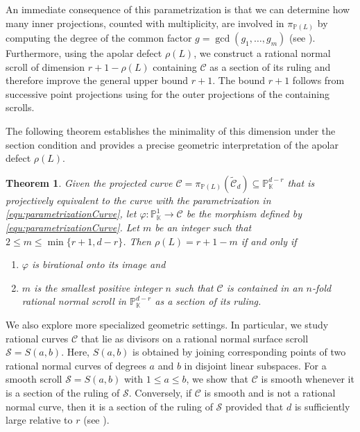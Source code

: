 \documentclass[a4paper, 11pt]{amsart}
\newtheorem{theorem}{Theorem}
\numberwithin{theorem}{section}
\theoremstyle{definition}
\numberwithin{equation}{section}
\begin{document}
An immediate consequence of this parametrization is that we can determine how many inner projections, counted with multiplicity, are involved in $\pi_{\mathbb{P}(L)}$ by computing the degree of the common factor $g=\gcd(g_1,\dots,g_m)$ (see ).
Furthermore, using the apolar defect $\rho(L)$, we construct a rational normal scroll of dimension $r+1-\rho(L)$ containing $\mathcal{C}$ as a section of its ruling and therefore improve the general upper bound $r+1$.
The bound $r+1$ follows from successive point projections using \cite[Theorem~7.3]{MR2274517} for the outer projections of the containing scrolls.

The following theorem establishes the minimality of this dimension under the section condition and provides a precise geometric interpretation of the apolar defect $\rho(L)$.
\begin{theorem}\label{thm:minimalSectionScroll}
Given the projected curve $\mathcal{C}=\pi_{\mathbb{P}(L)}(\widetilde{\mathcal{C}}_d)\subseteq\mathbb{P}_{\mathbb{K}}^{d-r}$ that is projectively equivalent to the curve with the parametrization in \eqref{equ:parametrizationCurve}, let $\varphi:\mathbb{P}_{\mathbb{K}}^1\longrightarrow\mathcal{C}$ be the morphism defined by \eqref{equ:parametrizationCurve}.
Let $m$ be an integer such that $2\leq m\leq \min\{r+1,d-r\}$.
Then $\rho(L)=r+1-m$ if and only if 
\begin{enumerate}
    \item $\varphi$ is birational onto its image and 
    \item $m$ is the smallest positive integer $n$ such that $\mathcal{C}$ is contained in an $n$-fold rational normal scroll in $\mathbb{P}_{\mathbb{K}}^{d-r}$ as a section of its ruling.
\end{enumerate}
\end{theorem}

We also explore more specialized geometric settings.
In particular, we study rational curves $\mathcal{C}$ that lie as divisors on a rational normal surface scroll $\mathcal{S}=S(a,b)$.
Here, $S(a,b)$ is obtained by joining corresponding points of two rational normal curves of degrees $a$ and $b$ in disjoint linear subspaces.
For a smooth scroll $\mathcal{S}=S(a,b)$ with $1\leq a\leq b$, we show that $\mathcal{C}$ is smooth whenever it is a section of the ruling of $\mathcal{S}$.
Conversely, if $\mathcal{C}$ is smooth and is not a rational normal curve, then it is a section of the ruling of $\mathcal{S}$ provided that $d$ is sufficiently large relative to $r$ (see ).
\end{document}
